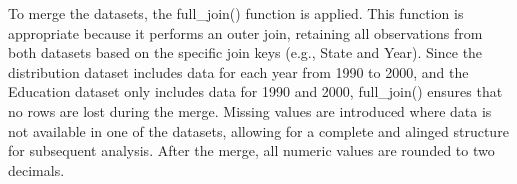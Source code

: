 \documentclass[
]{article}
\newenvironment{Shaded}{\begin{snugshade}}{\end{snugshade}}
\newcommand{\AttributeTok}[1]{\textcolor[rgb]{0.13,0.29,0.53}{#1}}
\newcommand{\ConstantTok}[1]{\textcolor[rgb]{0.56,0.35,0.01}{#1}}
\newcommand{\DecValTok}[1]{\textcolor[rgb]{0.00,0.00,0.81}{#1}}
\newcommand{\FunctionTok}[1]{\textcolor[rgb]{0.13,0.29,0.53}{\textbf{#1}}}
\newcommand{\NormalTok}[1]{#1}
\newcommand{\OtherTok}[1]{\textcolor[rgb]{0.56,0.35,0.01}{#1}}
\newcommand{\SpecialCharTok}[1]{\textcolor[rgb]{0.81,0.36,0.00}{\textbf{#1}}}
\begin{document}
\begin{Shaded}
\end{Shaded}

To merge the datasets, the full\_join() function is applied. This
function is appropriate because it performs an outer join, retaining all
observations from both datasets based on the specific join keys (e.g.,
State and Year). Since the distribution dataset includes data for each
year from 1990 to 2000, and the Education dataset only includes data for
1990 and 2000, full\_join() ensures that no rows are lost during the
merge. Missing values are introduced where data is not available in one
of the datasets, allowing for a complete and alinged structure for
subsequent analysis. After the merge, all numeric values are rounded to
two decimals.
\end{document}
